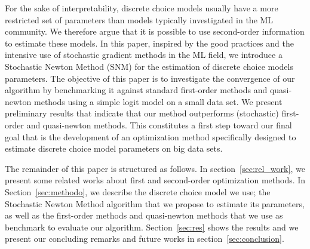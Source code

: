 \documentclass[conference]{IEEEtran}
\begin{document}
For the sake of interpretability, discrete choice models usually have a more restricted set of parameters than models typically investigated in the ML community. We therefore argue that it is possible to use second-order information to estimate these models. In this paper, inspired by the good practices and the intensive use of stochastic gradient methods in the ML field, we introduce a Stochastic Newton Method (SNM) for the estimation of discrete choice models parameters. The objective of this paper is to investigate the convergence of our algorithm by benchmarking it against standard first-order methods and quasi-newton methods using a simple logit model on a small data set. We present preliminary results that indicate that our method outperforms (stochastic) first-order and quasi-newton methods. This constitutes a first step toward our final goal that is the development of an optimization method specifically designed to estimate discrete choice model parameters on big data sets. %

The remainder of this paper is structured as follows. In section~\ref{sec:rel_work}, we present some related works about first and second-order optimization methods. In Section~\ref{sec:methodo}, we describe the discrete choice model we use; the Stochastic Newton Method algorithm that we propose to estimate its parameters, as well as the first-order methods and quasi-newton methods that we use as benchmark to evaluate our algorithm. Section~\ref{sec:res} shows the results and we present our concluding remarks and future works in section~\ref{sec:conclusion}. 


\end{document}
